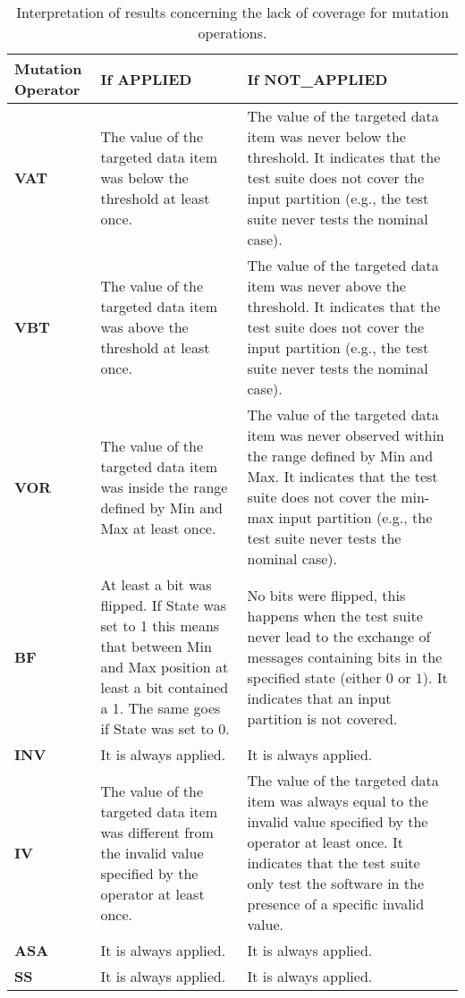 \begin{table}[]
\caption{Interpretation of results concerning the lack of coverage for mutation operations.}
\label{table:damat:interpretation}
\begin{tabular}{|p{2cm}|p{6cm}|p{6cm}|}
\hline
\textbf{Mutation Operator} & \textbf{If APPLIED} & \textbf{If NOT\_APPLIED} \\ \hline
\textbf{VAT} & The value of the targeted data item was below the threshold at least once. & The value of the targeted data item was never below the threshold. It indicates that the test suite does not cover the input partition (e.g., the test suite never tests the nominal case). \\ \hline
\textbf{VBT} & The value of the targeted data item was above the threshold at least once. & The value of the targeted data item was never above the threshold. It indicates that the test suite does not cover the input partition (e.g., the test suite never tests the nominal case). \\ \hline
\textbf{VOR} & The value of the targeted data item was inside the range defined by Min and Max at least once. & The value of the targeted data item was never observed within the range defined by Min and Max. It indicates that the test suite does not cover the min-max input partition (e.g., the test suite never tests the nominal case). \\ \hline
\textbf{BF} & At least a bit was flipped. If State was set to 1 this means that between Min and Max position at least a bit contained a 1. The same goes if State was set to 0. & No bits were flipped, this happens when the test suite never lead to the exchange of messages containing bits in the specified state (either $0$ or $1$). It indicates that an input partition is not covered.\\ \hline
\textbf{INV} & It is always applied.& It is always applied.\\ \hline
\textbf{IV} & The value of the targeted data item was different from the invalid value specified by the operator at least once.& 
The value of the targeted data item was always equal to the invalid value specified by the operator at least once. It indicates that the test suite only test the software in the presence of a specific invalid value.\\ \hline
\textbf{ASA} & It is always applied.& It is always applied.\\ \hline
\textbf{SS} & It is always applied.& It is always applied.\\ \hline

\end{tabular}
\end{table}
